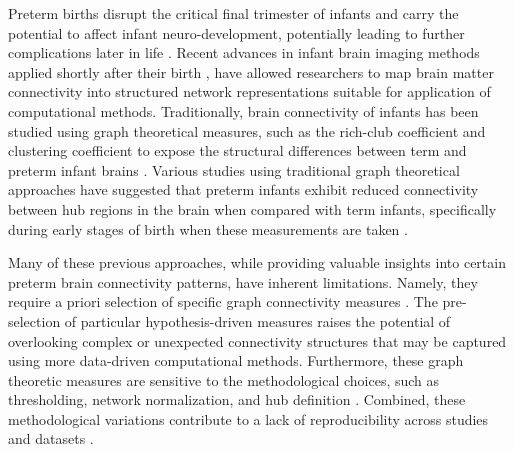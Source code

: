 \documentclass[doubleblind]{ecai}
\begin{document}
Preterm births disrupt the critical final trimester of infants and carry the potential to affect infant neuro-development, potentially leading to further complications later in life \cite{schuetze2016morphological,ball2012effect,ream2018neurologic,lee2021cingulum}. Recent advances in infant brain imaging methods applied shortly after their birth \cite{taoudi2022predicting}, have allowed researchers to map brain matter connectivity into structured network representations suitable for application of computational methods. Traditionally, brain connectivity of infants has been studied using graph theoretical measures, such as the rich-club coefficient and clustering coefficient to expose the structural differences between term and preterm infant brains \cite{taoudi2022predicting,batalle2017early,karolis2016reinforcement}. Various studies using traditional graph theoretical approaches have suggested that preterm infants exhibit reduced connectivity between hub regions in the brain when compared with term infants, specifically during early stages of birth when these measurements are taken \cite{batalle2017early,karolis2016reinforcement,taoudi2022predicting,bauer2017nonlinear}.



Many of these previous approaches, while providing valuable insights into certain preterm brain connectivity patterns, have inherent limitations. Namely, they require a priori selection of specific graph connectivity measures \cite{cui2022braingb}. The pre-selection of particular hypothesis-driven measures \cite{van2010comparing,cui2022braingb} raises the potential of overlooking complex or unexpected connectivity structures that may be captured using more data-driven computational methods. Furthermore, these graph theoretic measures are sensitive to the methodological choices, such as thresholding, network normalization, and hub definition \cite{van2010comparing}. Combined, these methodological variations contribute to a lack of reproducibility across studies and datasets \cite{van2010comparing}.



\end{document}
